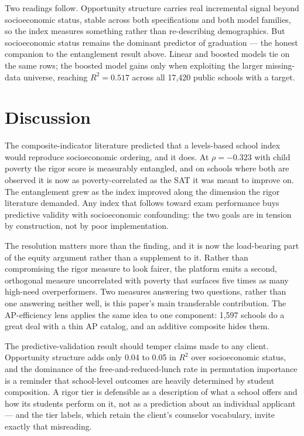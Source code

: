 \documentclass[12pt]{article}
\begin{document}
Two readings follow. Opportunity structure carries real incremental signal beyond socioeconomic status, stable across both specifications and both model families, so the index measures something rather than re-describing demographics. But socioeconomic status remains the dominant predictor of graduation --- the honest companion to the entanglement result above. Linear and boosted models tie on the same rows; the boosted model gains only when exploiting the larger missing-data universe, reaching $R^2 = 0.517$ across all 17{,}420 public schools with a target.

\section{Discussion}
\label{sec:discussion}

The composite-indicator literature predicted that a levels-based school index would reproduce socioeconomic ordering, and it does. At $\rho = -0.323$ with child poverty the rigor score is measurably entangled, and on schools where both are observed it is now as poverty-correlated as the SAT it was meant to improve on. The entanglement grew as the index improved along the dimension the rigor literature demanded. Any index that follows \citet{geiser2004} toward exam performance buys predictive validity with socioeconomic confounding: the two goals are in tension by construction, not by poor implementation.

The resolution matters more than the finding, and it is now the load-bearing part of the equity argument rather than a supplement to it. Rather than compromising the rigor measure to look fairer, the platform emits a second, orthogonal measure uncorrelated with poverty that surfaces five times as many high-need overperformers. Two measures answering two questions, rather than one answering neither well, is this paper's main transferable contribution. The AP-efficiency lens applies the same idea to one component: 1{,}597 schools do a great deal with a thin AP catalog, and an additive composite hides them.

The predictive-validation result should temper claims made to any client. Opportunity structure adds only 0.04 to 0.05 in $R^2$ over socioeconomic status, and the dominance of the free-and-reduced-lunch rate in permutation importance is a reminder that school-level outcomes are heavily determined by student composition. A rigor tier is defensible as a description of what a school offers and how its students perform on it, not as a prediction about an individual applicant --- and the tier labels, which retain the client's counselor vocabulary, invite exactly that misreading.
\end{document}
